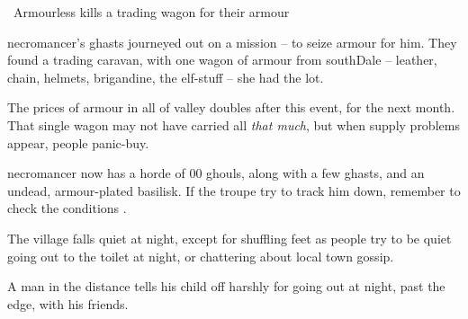 \boxPair[t]{
  \thenecromancer
}{
  \showStdSpells
}

{\squash~Armourless}%
{ kills a trading wagon for their armour}%
\label{necroArmour}

\begin{exampletext}
  \Gls{necromancer}'s ghasts journeyed out on a mission -- to seize armour for him.
  They found a trading caravan, with one wagon of armour from \gls{southDale} -- leather, chain, helmets, brigandine, the elf-stuff -- she had the lot.
\end{exampletext}

The prices of armour in all of \gls{valley} doubles after this event, for the next month.
That single wagon may not have carried all \emph{that much}, but when supply problems appear, people panic-buy.

\Gls{necromancer} now has a horde of 00 ghouls, along with a few ghasts, and an undead, armour-plated \gls{basilisk}.
If the troupe try to track him down, remember to check the conditions .

\begin{boxtext}
  The \gls{village} falls quiet at night, except for shuffling feet as people try to be quiet going out to the toilet at night, or chattering about local town gossip.

  A man in the distance tells his child off harshly for going out at night, past the \gls{edge}, with his friends.
\end{boxtext}


